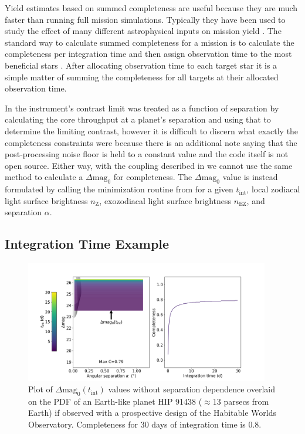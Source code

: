 Yield estimates based on summed completeness are useful because they are much
faster than running full mission simulations. Typically they have been used to
study the effect of many different astrophysical inputs on mission yield
\citep{starkMaximizingExoEarthCandidate2014, Stark2016,
starkExoEarthYieldLandscape2019}. The standard way to calculate summed
completeness for a mission is to calculate the completeness per integration
time and then assign observation time to the most beneficial stars
\citep{hunyadiSingleVisitCompleteness2005,
starkMaximizingExoEarthCandidate2014}. After allocating observation time to
each target star it is a simple matter of summing the completeness for all
targets at their allocated observation time.

In \citet{starkExoEarthYieldLandscape2019} the instrument's contrast limit was
treated as a function of separation by calculating the core throughput at a
planet's separation and using that to determine the limiting contrast, however
it is difficult to discern what exactly the completeness constraints were because
there is an additional note saying that the post-processing noise floor is held to a constant
value and the code itself is not open source. Either way, with the
coupling described in  we cannot use the same method to calculate
a $\Delta\textrm{mag}_0$ for completeness. The $\Delta\textrm{mag}_0$ value is instead
formulated by calling the minimization routine from  
for a given $t_\textrm{int}$, local zodiacal light surface brightness $n_\textrm{Z}$,
exozodiacal light surface brightness $n_\textrm{EZ}$, and separation $\alpha$.

\subsection{Integration Time Example}
\label{sub:comp_per_inttime}

\begin{figure}
  \begin{center}
    \includegraphics[width=0.95\textwidth]{ch3/figures/default_dmag_curve.png}
  \end{center}
  \caption{Plot of $\Delta\textrm{mag}_0(t_\textrm{int})$ values without separation dependence
  overlaid on the PDF of an Earth-like planet HIP 91438 ($\approx$13 parsecs from Earth)
  if observed with a prospective design of the Habitable Worlds Observatory.
  Completeness for 30 days of integration time is 0.8.}
  \label{fig:default_dmag_curve}
\end{figure}

